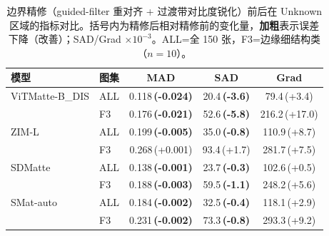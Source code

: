 \begin{table}[htbp]
\centering
\small
\setlength{\tabcolsep}{4pt}
\caption{边界精修（guided-filter 重对齐 + 过渡带对比度锐化）前后在 Unknown 区域的指标对比。括号内为精修后相对精修前的变化量，\textbf{加粗}表示误差下降（改善）；SAD/Grad $\times 10^{-3}$。ALL=全 150 张，F3=边缘细结构类（$n=10$）。}
\label{tab:refine}
\begin{tabular}{llccc}
\toprule
模型 & 图集 & MAD & SAD & Grad \\
\midrule
ViTMatte-B\_DIS & ALL & 0.118\,\textbf{(-0.024)} & 20.4\,\textbf{(-3.6)} & 79.4\,(+3.4) \\
 & F3 & 0.176\,\textbf{(-0.021)} & 52.6\,\textbf{(-5.8)} & 216.2\,(+17.0) \\
\midrule
ZIM-L & ALL & 0.199\,\textbf{(-0.005)} & 35.0\,\textbf{(-0.8)} & 110.9\,(+8.7) \\
 & F3 & 0.268\,(+0.001) & 93.4\,(+1.7) & 281.7\,(+7.5) \\
\midrule
SDMatte & ALL & 0.138\,\textbf{(-0.001)} & 23.7\,\textbf{(-0.3)} & 102.6\,(+0.5) \\
 & F3 & 0.188\,\textbf{(-0.003)} & 59.5\,\textbf{(-1.1)} & 248.2\,(+5.6) \\
\midrule
SMat-auto & ALL & 0.184\,\textbf{(-0.002)} & 32.5\,\textbf{(-0.4)} & 118.1\,(+2.9) \\
 & F3 & 0.231\,\textbf{(-0.002)} & 73.3\,\textbf{(-0.8)} & 293.3\,(+9.2) \\
\bottomrule
\end{tabular}
\end{table}
